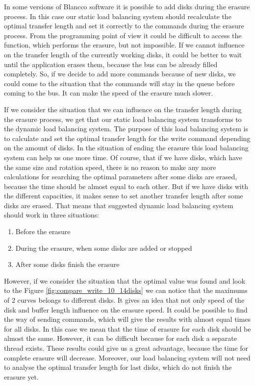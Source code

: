 In some versions of Blancco software it is possible to add disks during the erasure process. In this case our static load balancing system should recalculate the optimal transfer length and set it correctly to the commands during the erasure process. From the programming point of view it could be difficult to access the function, which performs the erasure, but not impossible. If we cannot influence on the transfer length of the currently working disks, it could be better to wait until the application erases them, because the bus can be already filled completely. So, if we decide to add more commands because of new disks, we could come to the situation that the commands will stay in the queue before coming to the bus. It can make the speed of the erasure much slower.

If we consider the situation that we can influence on the transfer length during the erasure process, we get that our static load balancing system transforms to the dynamic load balancing system. The purpose of this load balancing system is to calculate and set the optimal transfer length for the write command depending on the amount of disks. In the situation of ending the erasure this load balancing system can help us one more time. Of course, that if we have disks, which have the same size and rotation speed, there is no reason to make any more calculations for searching the optimal parameters after some disks are erased, because the time should be almost equal to each other. But if we have disks with the different capacities, it makes sense to set another transfer length after some disks are erased. That means that suggested dynamic load balancing system should work in three situations:
\begin{enumerate}
	\setlength{\itemsep}{-2mm}
	\item Before the erasure
	\item During the erasure, when some disks are added or stopped
	\item After some disks finish the erasure
\end{enumerate}

However, if we consider the situation that the optimal value was found and look to the Figure \ref{fig:compare_write_10_14disks} we can notice that the maximums of 2 curves belongs to different disks. It gives an idea that not only speed of the disk and buffer length influence on the erasure speed. It could be possible to find the way of sending commands, which will give the results with almost equal times for all disks. In this case we mean that the time of erasure for each disk should be almost the same. However, it can be difficult because for each disk a separate thread exists. These results could give us a great advantage, because the time for complete erasure will decrease. Moreover, our load balancing system will not need to analyse the optimal transfer length for last disks, which do not finish the erasure yet.

